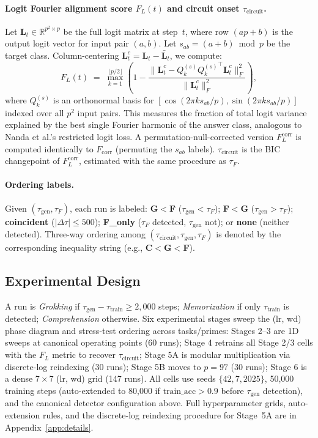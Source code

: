 \documentclass{article}
\newcommand{\taug}{\tau_{\mathrm{gen}}}
\newcommand{\tauf}{\tau_{F}}
\newcommand{\taucirc}{\tau_{\mathrm{circuit}}}
\newcommand{\Dtau}{\Delta\tau}
\newcommand{\fcorr}{F_{\mathrm{corr}}}
\newcommand{\flogit}{F_{L}}
\begin{document}
\paragraph{Logit Fourier alignment score $\flogit(t)$ and circuit onset $\taucirc$.}
Let $\mathbf{L}_t\!\in\!\mathbb{R}^{p^2\times p}$ be the full logit matrix
at step~$t$, where row $(ap+b)$ is the output logit vector for input
pair $(a,b)$.
Let $s_{ab}=(a+b)\bmod p$ be the target class.
Column-centering $\mathbf{L}_t^c = \mathbf{L}_t - \bar{\mathbf{L}}_t$,
we compute:
\begin{equation}
  \flogit(t) \;=\; \max_{k=1}^{\lfloor p/2\rfloor}
  \!\left(1 - \frac{\|\mathbf{L}_t^c - Q_k^{(s)} {Q_k^{(s)}}^\top
  \mathbf{L}_t^c\|_F^2}{\|\mathbf{L}_t^c\|_F^2}\right),
  \label{eq:f_logit}
\end{equation}
where $Q_k^{(s)}$ is an orthonormal basis for
$[\cos(2\pi k s_{ab}/p),\sin(2\pi k s_{ab}/p)]$ indexed over all
$p^2$ input pairs.
This measures the fraction of total logit variance explained by the
best single Fourier harmonic of the answer class, analogous to
Nanda et al.'s restricted logit loss.
A permutation-null-corrected version $\flogit^{\mathrm{corr}}$ is
computed identically to $\fcorr$ (permuting the $s_{ab}$ labels).
$\taucirc$ is the BIC changepoint of $\flogit^{\mathrm{corr}}$,
estimated with the same procedure as $\tauf$.


\paragraph{Ordering labels.}
Given $(\taug,\tauf)$, each run is labeled:
\textbf{G$<$F} ($\taug<\tauf$);
\textbf{F$<$G} ($\taug>\tauf$);
\textbf{coincident} ($|\Dtau|\leq500$);
\textbf{F\_only} ($\tauf$ detected, $\taug$ not);
or \textbf{none} (neither detected).
Three-way ordering among $(\taucirc, \taug, \tauf)$ is denoted by the
corresponding inequality string (e.g., \textbf{C$<$G$<$F}).

\subsection{Experimental Design}

A run is \emph{Grokking} if $\taug-\tau_{\mathrm{train}}\geq2{,}000$
steps; \emph{Memorization} if only $\tau_{\mathrm{train}}$ is
detected; \emph{Comprehension} otherwise. Six experimental stages
sweep the (lr, wd) phase diagram and stress-test ordering across
tasks/primes: Stages 2--3 are 1D sweeps at canonical operating
points (60 runs); Stage 4 retrains all Stage 2/3 cells with the
$\flogit$ metric to recover $\taucirc$; Stage 5A is modular
multiplication via discrete-log reindexing (30 runs); Stage 5B
moves to $p{=}97$ (30 runs); Stage 6 is a dense $7{\times}7$
(lr, wd) grid (147 runs). All cells use seeds $\{42, 7, 2025\}$,
50{,}000 training steps (auto-extended to 80{,}000 if
$\mathrm{train\_acc}>0.9$ before $\taug$ detection), and the
canonical detector configuration above. Full hyperparameter grids,
auto-extension rules, and the discrete-log reindexing procedure for
Stage~5A are in Appendix~\ref{app:details}.
\end{document}
